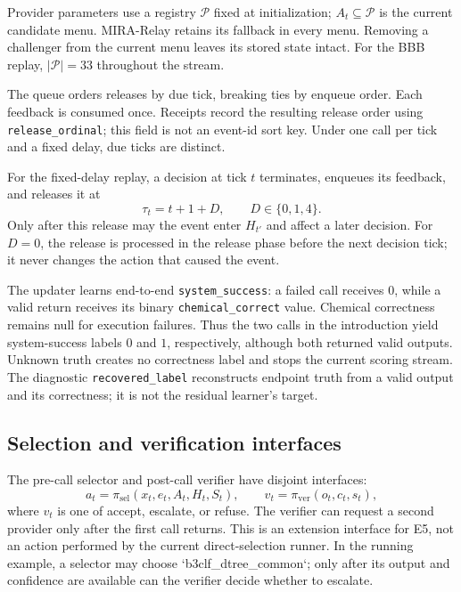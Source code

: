 \documentclass[sigconf,anonymous]{aamas}
\begin{document}
Provider parameters use a registry $\mathcal P$ fixed at initialization; $A_t\subseteq\mathcal P$ is the current candidate menu. MIRA-Relay retains its fallback in every menu. Removing a challenger from the current menu leaves its stored state intact. For the BBB replay, $|\mathcal P|=33$ throughout the stream.

The queue orders releases by due tick, breaking ties by enqueue order. Each feedback is consumed once. Receipts record the resulting release order using \texttt{release\_ordinal}; this field is not an event-id sort key. Under one call per tick and a fixed delay, due ticks are distinct.

For the fixed-delay replay, a decision at tick $t$ terminates, enqueues its feedback, and releases it at
$$
\tau_t=t+1+D,\qquad D\in\{0,1,4\}.
$$
Only after this release may the event enter $H_{t'}$ and affect a later decision.
For $D=0$, the release is processed in the release phase before the next decision tick; it never changes the action that caused the event.

The updater learns end-to-end \texttt{system\_success}: a failed call receives $0$, while a valid return receives its binary \texttt{chemical\_correct} value. Chemical correctness remains null for execution failures. Thus the two calls in the introduction yield system-success labels $0$ and $1$, respectively, although both returned valid outputs. Unknown truth creates no correctness label and stops the current scoring stream. The diagnostic \texttt{recovered\_label} reconstructs endpoint truth from a valid output and its correctness; it is not the residual learner's target.

\subsection{Selection and verification interfaces}
The pre-call selector and post-call verifier have disjoint interfaces:
$$
a_t=\pi_{\mathrm{sel}}(x_t,e_t,A_t,H_t,S_t),\qquad v_t=\pi_{\mathrm{ver}}(o_t,c_t,s_t),
$$
where $v_t$ is one of accept, escalate, or refuse. The verifier can request a second provider only after the first call returns. This is an extension interface for E5, not an action performed by the current direct-selection runner. In the running example, a selector may choose `b3clf\_dtree\_common`; only after its output and confidence are available can the verifier decide whether to escalate.
\end{document}
